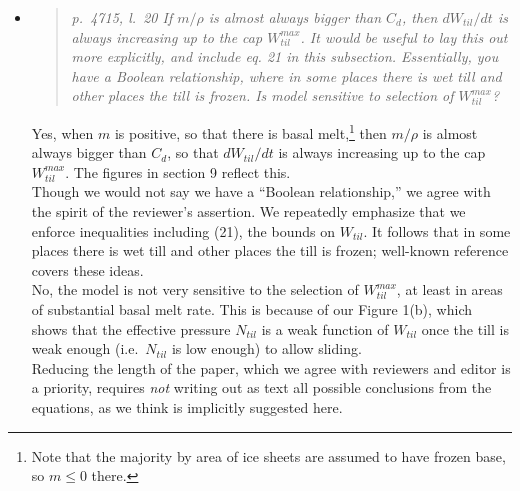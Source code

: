 \documentclass[11pt,reqno]{amsart}
\newcommand{\reply}[2]{
\medskip\medskip
\item  \begin{quote}
\emph{#1}
\end{quote}

\medskip
\noindent #2}
\begin{document}
\begin{itemize}
\reply{p.~4715, l.~20 If $m/\rho$ is almost always bigger than $C_d$, then $dW_{til}/dt$ is always increasing up to the cap $W_{til}^{max}$. It would be useful to lay this out more explicitly, and include eq. 21 in this subsection. Essentially, you have a Boolean relationship, where in some places there is wet till and other places the till is frozen. Is model sensitive to selection of $W_{til}^{max}$?}
{Yes, when $m$ is positive, so that there is basal melt,\footnote{Note that the majority by area of ice sheets are assumed to have frozen base, so $m\le 0$ there.} then $m/\rho$ is almost always bigger than $C_d$, so that $dW_{til}/dt$ is always increasing up to the cap $W_{til}^{max}$.  The figures in section 9 reflect this. \\
\indent Though we would not say we have a ``Boolean relationship,'' we agree with the spirit of the reviewer's assertion.  We repeatedly emphasize that we enforce inequalities including (21), the bounds on $W_{til}$.  It follows that in some places there is wet till and other places the till is frozen; well-known reference \cite{BBssasliding} covers these ideas.\\
\indent No, the model is not very sensitive to the selection of $W_{til}^{max}$, at least in areas of substantial basal melt rate.  This is because of our Figure 1(b), which shows that the effective pressure $N_{til}$ is a weak function of $W_{til}$ once the till is weak enough (i.e.~$N_{til}$ is low enough) to allow sliding. \\
\indent Reducing the length of the paper, which we agree with reviewers and editor is a priority, requires \emph{not} writing out as text all possible conclusions from the equations, as we think is implicitly suggested here.}


\end{itemize}
\end{document}
